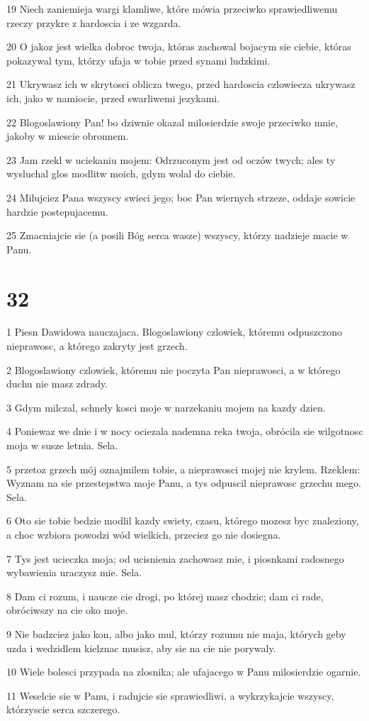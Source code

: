 \par 19 Niech zaniemieja wargi klamliwe, które mówia przeciwko sprawiedliwemu rzeczy przykre z hardoscia i ze wzgarda.
\par 20 O jakoz jest wielka dobroc twoja, któras zachowal bojacym sie ciebie, któras pokazywal tym, którzy ufaja w tobie przed synami ludzkimi.
\par 21 Ukrywasz ich w skrytosci oblicza twego, przed hardoscia czlowiecza ukrywasz ich, jako w namiocie, przed swarliwemi jezykami.
\par 22 Blogoslawiony Pan! bo dziwnie okazal milosierdzie swoje przeciwko mnie, jakoby w miescie obronnem.
\par 23 Jam rzekl w uciekaniu mojem: Odrzuconym jest od oczów twych; ales ty wysluchal glos modlitw moich, gdym wolal do ciebie.
\par 24 Milujciez Pana wszyscy swieci jego; boc Pan wiernych strzeze, oddaje sowicie hardzie postepujacemu.
\par 25 Zmacniajcie sie (a posili Bóg serca wasze) wszyscy, którzy nadzieje macie w Panu.

\chapter{32}

\par 1 Piesn Dawidowa nauczajaca. Blogoslawiony czlowiek, któremu odpuszczono nieprawosc, a którego zakryty jest grzech.
\par 2 Blogoslawiony czlowiek, któremu nie poczyta Pan nieprawosci, a w którego duchu nie masz zdrady.
\par 3 Gdym milczal, schnely kosci moje w narzekaniu mojem na kazdy dzien.
\par 4 Poniewaz we dnie i w nocy ociezala nademna reka twoja, obrócila sie wilgotnosc moja w susze letnia. Sela.
\par 5 przetoz grzech mój oznajmilem tobie, a nieprawosci mojej nie krylem. Rzeklem: Wyznam na sie przestepstwa moje Panu, a tys odpuscil nieprawosc grzechu mego. Sela.
\par 6 Oto sie tobie bedzie modlil kazdy swiety, czasu, którego mozesz byc znaleziony, a choc wzbiora powodzi wód wielkich, przeciez go nie dosiegna.
\par 7 Tys jest ucieczka moja; od ucisnienia zachowasz mie, i piosnkami radosnego wybawienia uraczysz mie. Sela.
\par 8 Dam ci rozum, i naucze cie drogi, po której masz chodzic; dam ci rade, obróciwszy na cie oko moje.
\par 9 Nie badzciez jako kon, albo jako mul, którzy rozumu nie maja, których geby uzda i wedzidlem kielznac musisz, aby sie na cie nie porywaly.
\par 10 Wiele bolesci przypada na zlosnika; ale ufajacego w Panu milosierdzie ogarnie.
\par 11 Weselcie sie w Panu, i radujcie sie sprawiedliwi, a wykrzykajcie wszyscy, którzyscie serca szczerego.

